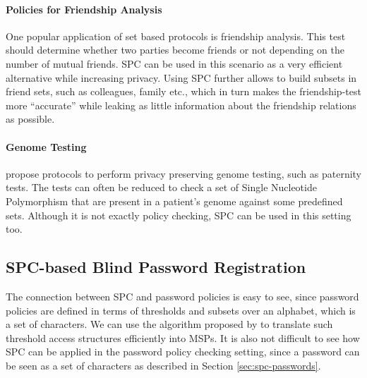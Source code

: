 \paragraph{Policies for Friendship Analysis}
One popular application of set based protocols is friendship analysis.
This test should determine whether two parties become friends or not depending on the number of mutual friends.
\ac{SPC} can be used in this scenario as a very efficient alternative while increasing privacy.
Using \ac{SPC} further allows to build subsets in friend sets, such as colleagues, family etc., which in turn makes the friendship-test more ``accurate'' while leaking as little information about the friendship relations as possible.

\paragraph{Genome Testing}
\citet{BaldiBCGT11} propose protocols to perform privacy preserving genome testing, such as paternity tests. 
The tests can often be reduced to check a set of Single Nucleotide Polymorphism that are present in a patient's genome against some predefined sets. 
Although it is not exactly policy checking, \ac{SPC} can be used in this setting too. 


\subsection{SPC-based Blind Password Registration}\label{sec:spc-bpr-protocol}

The connection between \acl{SPC} and password policies is easy to see, since password policies are defined in terms of thresholds and subsets over an alphabet, which is a set of characters.
We can use the algorithm proposed by \citet{LiuC10} to translate such threshold access structures efficiently into \acp{MSP}. 
It is also not difficult to see how \ac{SPC} can be applied in the password policy checking setting, since a password can be seen as a set of characters as described in Section \ref{sec:spc-passwords}. 

